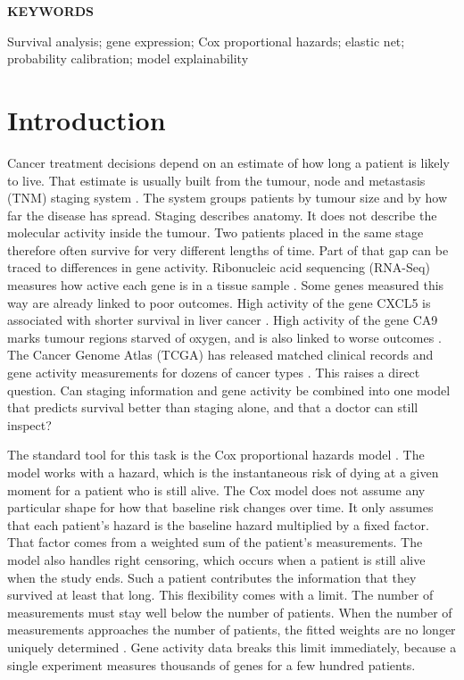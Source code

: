 \documentclass[10pt,a4paper]{article}
\begin{document}
\vspace{1em}
{\bfseries KEYWORDS\par}

Survival analysis; gene expression; Cox proportional hazards; elastic net;
probability calibration; model explainability

\vspace{3pt}

\section{Introduction}

Cancer treatment decisions depend on an estimate of how long a patient is likely
to live. That estimate is usually built from the tumour, node and metastasis
(TNM) staging system \citep{amin2017ajcc}. The system groups patients by tumour
size and by how far the disease has spread. Staging describes anatomy. It does not
describe the molecular activity inside the tumour. Two patients placed in the
same stage therefore often survive for very different lengths of time. Part of
that gap can be traced to differences in gene activity. Ribonucleic acid
sequencing (RNA-Seq) measures how active each gene is in a tissue sample
\citep{li2011rsem}. Some genes measured this way are already linked to poor
outcomes. High activity of the gene CXCL5 is associated with shorter survival in
liver cancer \citep{zhou2012overexpression}. High activity of the gene CA9
marks tumour regions starved of oxygen, and is also linked to worse outcomes
\citep{giatromanolaki2001carbonic}. The Cancer Genome Atlas (TCGA) has released
matched clinical records and gene activity measurements for dozens of cancer
types \citep{weinstein2013cancer}. This raises a direct question. Can staging
information and gene activity be combined into one model that predicts survival
better than staging alone, and that a doctor can still inspect?

The standard tool for this task is the Cox proportional hazards model
\citep{cox1972regression}. The model works with a hazard, which is the
instantaneous risk of dying at a given moment for a patient who is still alive.
The Cox model does not assume any particular shape for how that baseline risk
changes over time. It only assumes that each patient's hazard is the baseline
hazard multiplied by a fixed factor. That factor comes from a weighted sum of
the patient's measurements. The model also handles right censoring, which occurs
when a patient is still alive when the study ends. Such a patient contributes
the information that they survived at least that long. This flexibility comes
with a limit. The number of measurements must stay well below the number of
patients. When the number of measurements approaches the number of patients, the
fitted weights are no longer uniquely determined \citep{tibshirani1997lasso}.
Gene activity data breaks this limit immediately, because a single experiment
measures thousands of genes for a few hundred patients.
\end{document}
